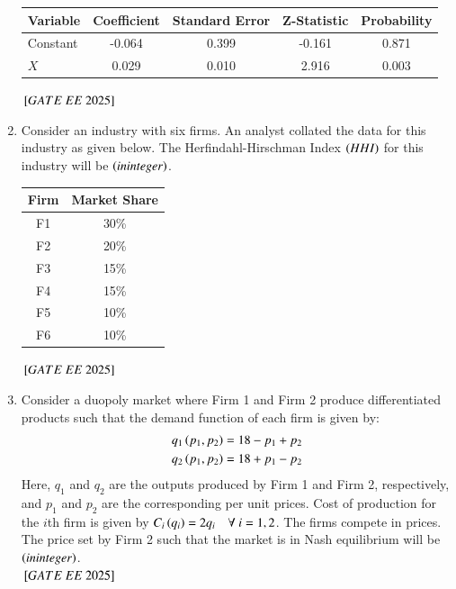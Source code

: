 \documentclass[journal,12pt,onecolumn]{IEEEtran}
\theoremstyle{remark}
\begin{document}
\begin{enumerate}
\begin{center}
\begin{tabular}{|l|c|c|c|c|}
\hline
Variable & Coefficient & Standard Error & Z-Statistic & Probability \\
\hline
Constant & -0.064 & 0.399 & -0.161 & 0.871 \\
$X$ & 0.029 & 0.010 & 2.916 & 0.003 \\
\hline
\end{tabular}
\end{center}
 \hfill ${}\left[GATE\ EE\ 2025\right]$
\item Consider an industry with six firms. An analyst collated the data for this industry as given below. The Herfindahl-Hirschman Index $\left(HHI\right)$ for this industry will be \underline{\hspace{2cm}} $\left(in integer\right)$.
\begin{center}
\begin{tabular}{|c|c|}
\hline
Firm & Market Share \\
\hline
F1 & 30\% \\
F2 & 20\% \\
F3 & 15\% \\
F4 & 15\% \\
F5 & 10\% \\
F6 & 10\% \\
\hline
\end{tabular}
\end{center} 
 \hfill ${}\left[GATE\ EE\ 2025\right]$
\item Consider a duopoly market where Firm 1 and Firm 2 produce differentiated products such that the demand function of each firm is given by:
\begin{align*}
q_1\left(p_1, p_2\right) &= 18 - p_1 + p_2 \\
q_2\left(p_1, p_2\right) &= 18 + p_1 - p_2
\end{align*}
Here, $q_1$ and $q_2$ are the outputs produced by Firm 1 and Firm 2, respectively, and $p_1$ and $p_2$ are the corresponding per unit prices. Cost of production for the $i$th firm is given by $C_i\left(q_i\right) = 2q_i \quad \forall~i=1,2$. The firms compete in prices. The price set by Firm 2 such that the market is in Nash equilibrium will be \underline{\hspace{2cm}} $\left(in integer\right)$.\\

 \hfill ${}\left[GATE\ EE\ 2025\right]$
\end{enumerate}
\renewcommand{\thefigure}{\theenumi}
\renewcommand{\thetable}{\theenumi}
\end{document}
